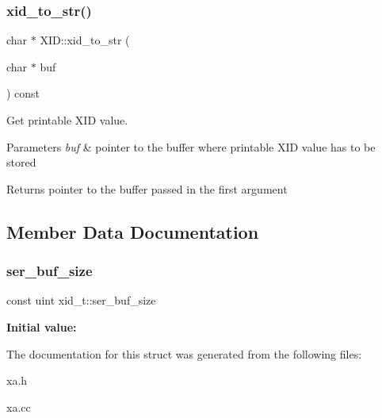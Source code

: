\subsubsection{\texorpdfstring{xid\+\_\+to\+\_\+str()}{xid\_to\_str()}}
{\footnotesize\ttfamily char $\ast$ X\+I\+D\+::xid\+\_\+to\+\_\+str (\begin{DoxyParamCaption}\item[{char $\ast$}]{buf }\end{DoxyParamCaption}) const}

Get printable X\+ID value.


\begin{DoxyParams}{Parameters}
{\em buf} & pointer to the buffer where printable X\+ID value has to be stored\\
\hline
\end{DoxyParams}
\begin{DoxyReturn}{Returns}
pointer to the buffer passed in the first argument 
\end{DoxyReturn}


\subsection{Member Data Documentation}
\mbox{\label{structxid__t_a7131b77aefe995cc35fe1d44da1e0270}} 
\subsubsection{\texorpdfstring{ser\+\_\+buf\+\_\+size}{ser\_buf\_size}}
{\footnotesize\ttfamily const uint xid\+\_\+t\+::ser\+\_\+buf\+\_\+size\hspace{0.3cm}{\ttfamily [static]}}

{\bfseries Initial value\+:}
\begin{DoxyCode}{0}
\DoxyCodeLine{=}
\end{DoxyCode}


The documentation for this struct was generated from the following files\+:\begin{DoxyCompactItemize}
\item 
xa.\+h\item 
xa.\+cc\end{DoxyCompactItemize}
